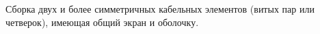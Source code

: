 Сборка двух и более симметричных кабельных
элементов (витых пар или четверок), имеющая
общий экран и оболочку.